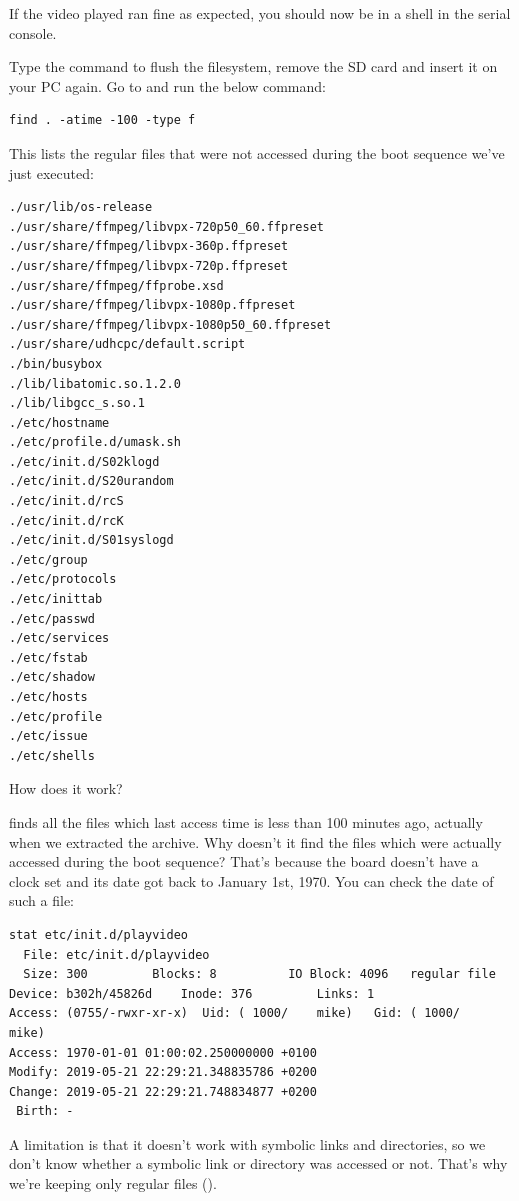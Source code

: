 If the video played ran fine as expected, you should now be in a shell
in the serial console.

Type the  command to flush the filesystem, remove the SD card
and insert it on your PC again. Go to  and run
the below command:

\begin{verbatim}
find . -atime -100 -type f
\end{verbatim}

This lists the regular files that were not accessed during the boot
sequence we've just executed:

\begin{verbatim}
./usr/lib/os-release
./usr/share/ffmpeg/libvpx-720p50_60.ffpreset
./usr/share/ffmpeg/libvpx-360p.ffpreset
./usr/share/ffmpeg/libvpx-720p.ffpreset
./usr/share/ffmpeg/ffprobe.xsd
./usr/share/ffmpeg/libvpx-1080p.ffpreset
./usr/share/ffmpeg/libvpx-1080p50_60.ffpreset
./usr/share/udhcpc/default.script
./bin/busybox
./lib/libatomic.so.1.2.0
./lib/libgcc_s.so.1
./etc/hostname
./etc/profile.d/umask.sh
./etc/init.d/S02klogd
./etc/init.d/S20urandom
./etc/init.d/rcS
./etc/init.d/rcK
./etc/init.d/S01syslogd
./etc/group
./etc/protocols
./etc/inittab
./etc/passwd
./etc/services
./etc/fstab
./etc/shadow
./etc/hosts
./etc/profile
./etc/issue
./etc/shells
\end{verbatim}

How does it work?

 finds all the files which last access time is
less than 100 minutes ago, actually when we extracted the archive.
Why doesn't it find the files which were actually accessed during the
boot sequence? That's because the board doesn't have a clock set and its
date got back to January 1st, 1970. You can check the date of such a
file:

\begin{verbatim}
stat etc/init.d/playvideo
  File: etc/init.d/playvideo
  Size: 300       	Blocks: 8          IO Block: 4096   regular file
Device: b302h/45826d	Inode: 376         Links: 1
Access: (0755/-rwxr-xr-x)  Uid: ( 1000/    mike)   Gid: ( 1000/    mike)
Access: 1970-01-01 01:00:02.250000000 +0100
Modify: 2019-05-21 22:29:21.348835786 +0200
Change: 2019-05-21 22:29:21.748834877 +0200
 Birth: -
\end{verbatim}

A limitation is that it doesn't work with symbolic links and directories, so we don't
know whether a symbolic link or directory was accessed or not. That's why we're
keeping only regular files ().

